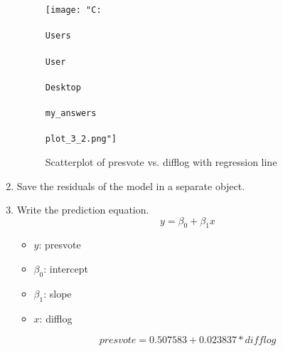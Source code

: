 \documentclass[12pt,letterpaper]{article}
\begin{document}
\begin{enumerate}
	
	
	\begin{figure}[h!]
		\centering
		\texttt{[image: "C:\\\\Users\\\\User\\\\Desktop\\\\my\_answers\\\\plot\_3\_2.png"]}
		\caption{Scatterplot of presvote vs. difflog with regression line}
		\label{fig:plot_2}
	\end{figure}
	
	\vspace{10cm}
	\item Save the residuals of the model in a separate object.
	\vspace{0.5cm}
	
	
	\item Write the prediction equation.
	\begin{equation}
		y = \beta_0 + \beta_1 x
	\end{equation}
	\begin{itemize}
		\item \( y \): presvote
		\item \(\beta_0\): intercept
		\item \(\beta_1 \): slope
		\item \( x \): difflog
	\end{itemize}
	\begin{equation}
		presvote = 0.507583+0.023837*difflog
	\end{equation}
	
	
\end{enumerate}
	
\end{document}
